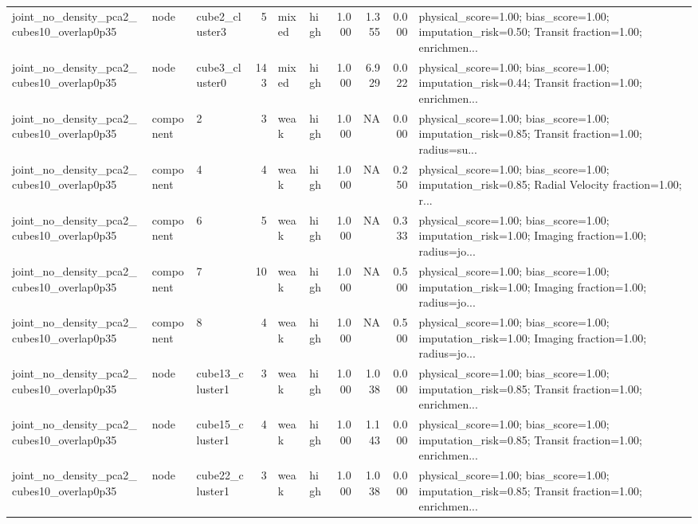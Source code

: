 \begin{table}[H]
\begin{adjustbox}{max width=\linewidth}
\begin{tabular}{lllrllrrrl}
joint\_no\_density\_pca2\_cubes10\_overlap0p35 & node & cube2\_cluster3 & 5 & mixed & high & 1.000 & 1.355 & 0.000 & physical\_score=1.00; bias\_score=1.00; imputation\_risk=0.50; Transit fraction=1.00; enrichmen... \\
joint\_no\_density\_pca2\_cubes10\_overlap0p35 & node & cube3\_cluster0 & 143 & mixed & high & 1.000 & 6.929 & 0.022 & physical\_score=1.00; bias\_score=1.00; imputation\_risk=0.44; Transit fraction=1.00; enrichmen... \\
joint\_no\_density\_pca2\_cubes10\_overlap0p35 & component & 2 & 3 & weak & high & 1.000 & NA & 0.000 & physical\_score=1.00; bias\_score=1.00; imputation\_risk=0.85; Transit fraction=1.00; radius=su... \\
joint\_no\_density\_pca2\_cubes10\_overlap0p35 & component & 4 & 4 & weak & high & 1.000 & NA & 0.250 & physical\_score=1.00; bias\_score=1.00; imputation\_risk=0.85; Radial Velocity fraction=1.00; r... \\
joint\_no\_density\_pca2\_cubes10\_overlap0p35 & component & 6 & 5 & weak & high & 1.000 & NA & 0.333 & physical\_score=1.00; bias\_score=1.00; imputation\_risk=1.00; Imaging fraction=1.00; radius=jo... \\
joint\_no\_density\_pca2\_cubes10\_overlap0p35 & component & 7 & 10 & weak & high & 1.000 & NA & 0.500 & physical\_score=1.00; bias\_score=1.00; imputation\_risk=1.00; Imaging fraction=1.00; radius=jo... \\
joint\_no\_density\_pca2\_cubes10\_overlap0p35 & component & 8 & 4 & weak & high & 1.000 & NA & 0.500 & physical\_score=1.00; bias\_score=1.00; imputation\_risk=1.00; Imaging fraction=1.00; radius=jo... \\
joint\_no\_density\_pca2\_cubes10\_overlap0p35 & node & cube13\_cluster1 & 3 & weak & high & 1.000 & 1.038 & 0.000 & physical\_score=1.00; bias\_score=1.00; imputation\_risk=0.85; Transit fraction=1.00; enrichmen... \\
joint\_no\_density\_pca2\_cubes10\_overlap0p35 & node & cube15\_cluster1 & 4 & weak & high & 1.000 & 1.143 & 0.000 & physical\_score=1.00; bias\_score=1.00; imputation\_risk=0.85; Transit fraction=1.00; enrichmen... \\
joint\_no\_density\_pca2\_cubes10\_overlap0p35 & node & cube22\_cluster1 & 3 & weak & high & 1.000 & 1.038 & 0.000 & physical\_score=1.00; bias\_score=1.00; imputation\_risk=0.85; Transit fraction=1.00; enrichmen... \\
\bottomrule
\end{tabular}
\end{adjustbox}

\end{table}
